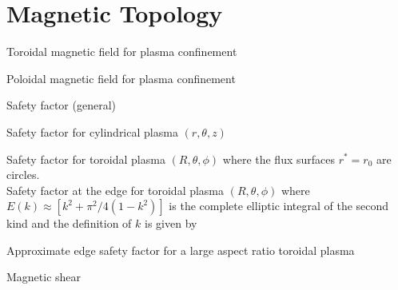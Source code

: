 \section{Magnetic Topology}

\noindent
Toroidal magnetic field for plasma confinement~~\cite{authors}

\noindent
Poloidal magnetic field for plasma confinement~~\cite{authors}

\noindent
Safety factor (general) 

\noindent
Safety factor for cylindrical plasma $(r,\theta,z)$ 

\noindent
Safety factor for toroidal plasma $(R,\theta,\phi)$ 
\indent where the flux surfaces $r^*=r_0$ are circles.\\

\noindent
Safety factor at the edge for toroidal plasma $(R,\theta,\phi)$ 
\hangindent=0.25in where $E(k)\approx \left[ k^{2}+\pi^{2}/4(1-k^{2})\right]$ is the complete elliptic integral of the second kind and the definition of $k$ is given by

\noindent
Approximate edge safety factor for a large aspect ratio toroidal plasma 

\noindent
Magnetic shear 



